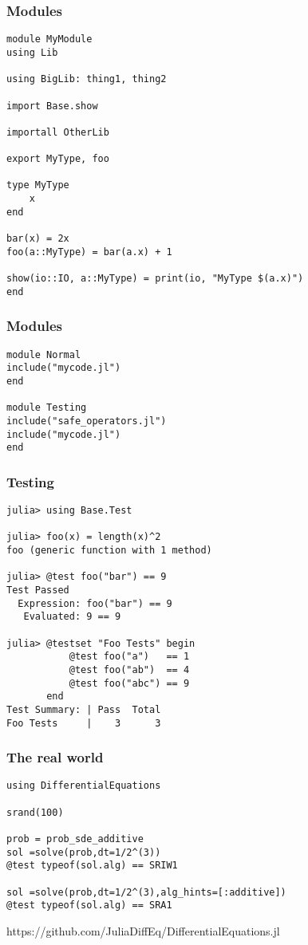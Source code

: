 \begin{frame}[fragile]
	\frametitle{Modules}
  \begin{tiny}
  \begin{verbatim}
module MyModule
using Lib

using BigLib: thing1, thing2

import Base.show

importall OtherLib

export MyType, foo

type MyType
    x
end

bar(x) = 2x
foo(a::MyType) = bar(a.x) + 1

show(io::IO, a::MyType) = print(io, "MyType $(a.x)")
end
  \end{verbatim}
  \end{tiny}
\end{frame}

\begin{frame}[fragile]
	\frametitle{Modules}
  \begin{tiny}
  \begin{verbatim}
module Normal
include("mycode.jl")
end

module Testing
include("safe_operators.jl")
include("mycode.jl")
end
  \end{verbatim}
  \end{tiny}
\end{frame}

\begin{frame}[fragile]
	\frametitle{Testing}
  \begin{tiny}
  \begin{verbatim}
julia> using Base.Test

julia> foo(x) = length(x)^2
foo (generic function with 1 method)

julia> @test foo("bar") == 9
Test Passed
  Expression: foo("bar") == 9
   Evaluated: 9 == 9

julia> @testset "Foo Tests" begin
           @test foo("a")   == 1
           @test foo("ab")  == 4
           @test foo("abc") == 9
       end
Test Summary: | Pass  Total
Foo Tests     |    3      3
  \end{verbatim}
  \end{tiny}
\end{frame}

\begin{frame}[fragile]
	\frametitle{The real world}
  \begin{tiny}
  \begin{verbatim}
using DifferentialEquations

srand(100)

prob = prob_sde_additive
sol =solve(prob,dt=1/2^(3))
@test typeof(sol.alg) == SRIW1

sol =solve(prob,dt=1/2^(3),alg_hints=[:additive])
@test typeof(sol.alg) == SRA1
  \end{verbatim}
  \end{tiny}
  \vspace{5.0mm}
   https://github.com/JuliaDiffEq/DifferentialEquations.jl
\end{frame}
